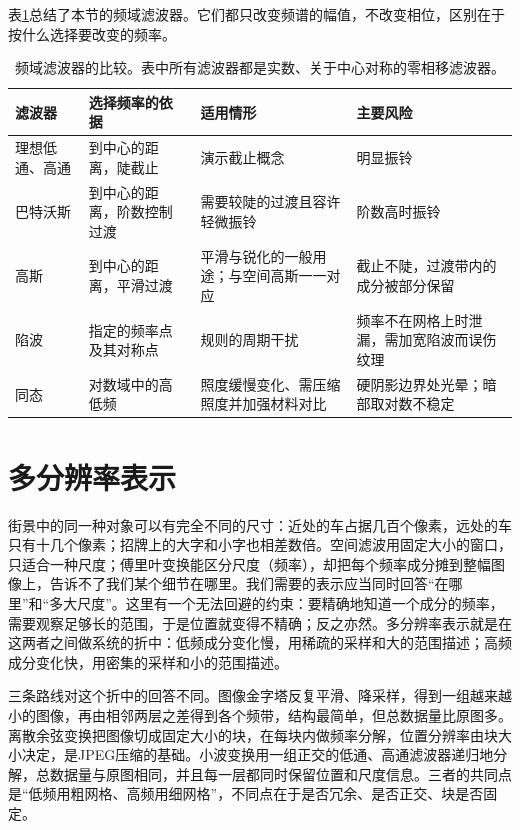 表\ref{tab:vision-transforms-frequency-compare}总结了本节的频域滤波器。它们都只改变频谱的幅值，不改变相位，区别在于按什么选择要改变的频率。

\begin{table}[tbp]
  \centering
  \small
  \begin{tabularx}{\linewidth}{@{}p{18mm}XXX@{}}
    \toprule
    滤波器 & 选择频率的依据 & 适用情形 & 主要风险\\
    \midrule
    理想低通、高通 & 到中心的距离，陡截止 & 演示截止概念 & 明显振铃\\
    巴特沃斯 & 到中心的距离，阶数控制过渡 & 需要较陡的过渡且容许轻微振铃 & 阶数高时振铃\\
    高斯 & 到中心的距离，平滑过渡 & 平滑与锐化的一般用途；与空间高斯一一对应 & 截止不陡，过渡带内的成分被部分保留\\
    陷波 & 指定的频率点及其对称点 & 规则的周期干扰 & 频率不在网格上时泄漏，需加宽陷波而误伤纹理\\
    同态 & 对数域中的高低频 & 照度缓慢变化、需压缩照度并加强材料对比 & 硬阴影边界处光晕；暗部取对数不稳定\\
    \bottomrule
  \end{tabularx}
  \caption{频域滤波器的比较。表中所有滤波器都是实数、关于中心对称的零相移滤波器。}
  \label{tab:vision-transforms-frequency-compare}
\end{table}

\section{多分辨率表示}
\label{sec:vision-transforms-multiresolution}

街景中的同一种对象可以有完全不同的尺寸：近处的车占据几百个像素，远处的车只有十几个像素；招牌上的大字和小字也相差数倍。空间滤波用固定大小的窗口，只适合一种尺度；傅里叶变换能区分尺度（频率），却把每个频率成分摊到整幅图像上，告诉不了我们某个细节在哪里。我们需要的表示应当同时回答“在哪里”和“多大尺度”。这里有一个无法回避的约束：要精确地知道一个成分的频率，需要观察足够长的范围，于是位置就变得不精确；反之亦然。多分辨率表示就是在这两者之间做系统的折中：低频成分变化慢，用稀疏的采样和大的范围描述；高频成分变化快，用密集的采样和小的范围描述。

三条路线对这个折中的回答不同。图像金字塔反复平滑、降采样，得到一组越来越小的图像，再由相邻两层之差得到各个频带，结构最简单，但总数据量比原图多。离散余弦变换把图像切成固定大小的块，在每块内做频率分解，位置分辨率由块大小决定，是JPEG压缩的基础。小波变换用一组正交的低通、高通滤波器递归地分解，总数据量与原图相同，并且每一层都同时保留位置和尺度信息。三者的共同点是“低频用粗网格、高频用细网格”，不同点在于是否冗余、是否正交、块是否固定。

